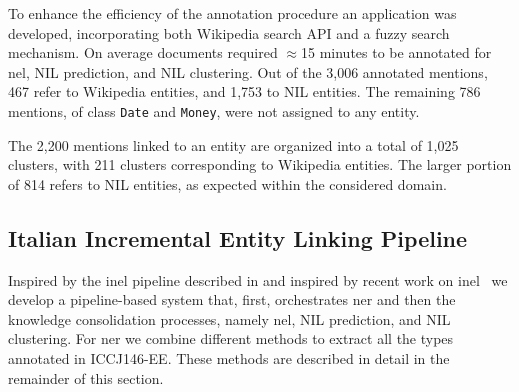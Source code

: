 
To enhance the efficiency of the annotation procedure an application was developed, incorporating both Wikipedia search API and a fuzzy search mechanism. On average documents required $\approx$15 minutes to be annotated for \ac{nel}, NIL prediction, and NIL clustering. Out of the 3,006 annotated mentions, 467 refer to Wikipedia entities, and 1,753 to NIL entities. The remaining 786 mentions, of class \texttt{Date} and \texttt{Money}, were not assigned to any entity.


The 2,200 mentions linked to an entity are organized into a total of 1,025 clusters, with 211 clusters corresponding to Wikipedia entities.
The larger portion of 814 refers to NIL entities, as expected within the considered domain.


\subsection{Italian Incremental Entity Linking Pipeline}
\label{sec:italia_ee_pipeline}

Inspired by the \ac{inel} pipeline described in  and inspired by recent work on \ac{inel}~\cite{Heist2023nastylinker,kassner-etal-2022-edin} we develop a pipeline-based system that, first, orchestrates \ac{ner} and then the knowledge consolidation processes, namely \ac{nel}, NIL prediction, and NIL clustering.
For \ac{ner} we combine different methods to extract all the types annotated in ICCJ146-EE. These methods are described in detail in the remainder of this section.

